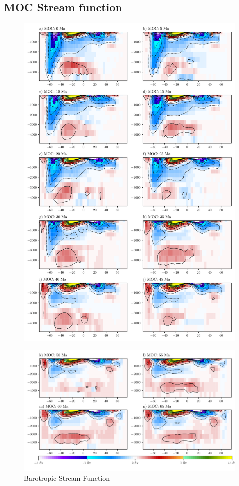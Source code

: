 \documentclass[a4paper]{article}
\begin{document}
\begin{multicols}{2}
\subsection{MOC Stream function}


\end{multicols}
\begin{figure}[H]

\includegraphics[width=1\linewidth]{MOC_1.pdf}
\end{figure}
\begin{figure}[H]
\includegraphics[width=1\linewidth]{MOC_2.pdf}
\caption{Barotropic Stream Function}
\label{fig:bsf_total}
\end{figure}
\end{document}
